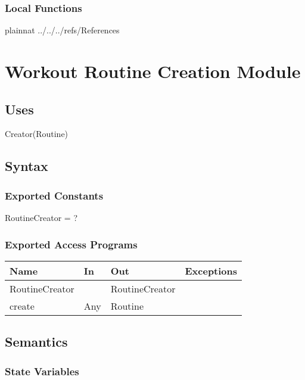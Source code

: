 \documentclass[12pt, titlepage]{article}
\begin{document}
\subsubsection{Local Functions}

\newpage

 {plainnat}
 {../../../refs/References}

\newpage

\section{Workout Routine Creation Module}

\subsection{Uses}

Creator(Routine)

\subsection{Syntax}

\subsubsection{Exported Constants}

RoutineCreator = ?

\subsubsection{Exported Access Programs}

\begin{center}
	\begin{tabular}{p{2cm} p{4cm} p{4cm} p{2cm}}
		\hline
		\textbf{Name} & \textbf{In} & \textbf{Out} & \textbf{Exceptions} \\
		\hline
		RoutineCreator &  & RoutineCreator &  \\
		create & Any & Routine &  \\
		\hline
	\end{tabular}
\end{center}

\subsection{Semantics}

\subsubsection{State Variables}
\end{document}
